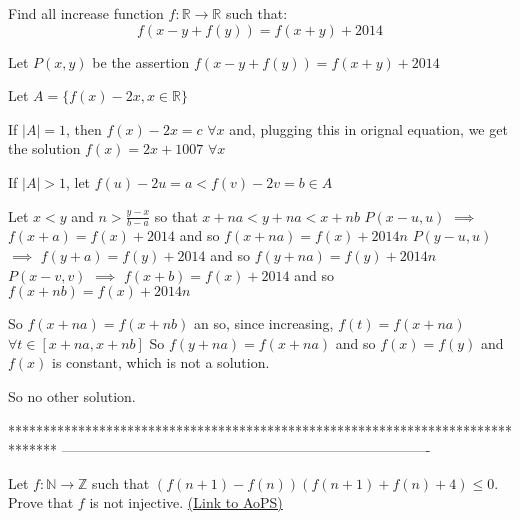 \begin{solution}
	\begin{tcolorbox}Find all increase function $f:\mathbb{R}\rightarrow \mathbb{R}$ such that:
\[f(x-y+f(y))=f(x+y)+2014\]\end{tcolorbox}
Let $P(x,y)$ be the assertion $f(x-y+f(y))=f(x+y)+2014$

Let $A=\{f(x)-2x, x\in\mathbb R\}$

If $|A|=1$, then $f(x)-2x=c$ $\forall x$ and, plugging this in orignal equation, we get the solution $\boxed{f(x)=2x+1007}$ $\forall x$

If $|A|>1$, let $f(u)-2u=a<f(v)-2v=b\in A$

Let $x<y$ and $n>\frac{y-x}{b-a}$ so that $x+na<y+na<x+nb$
$P(x-u,u)$ $\implies$ $f(x+a)=f(x)+2014$ and so $f(x+na)=f(x)+2014n$
$P(y-u,u)$ $\implies$ $f(y+a)=f(y)+2014$ and so $f(y+na)=f(y)+2014n$
$P(x-v,v)$ $\implies$ $f(x+b)=f(x)+2014$ and so $f(x+nb)=f(x)+2014n$

So $f(x+na)=f(x+nb)$ an so, since increasing, $f(t)=f(x+na)$ $\forall t\in[x+na, x+nb]$
So $f(y+na)=f(x+na)$ and so $f(x)=f(y)$ and $f(x)$ is constant, which is not a solution.

So no other solution.
\end{solution}
*******************************************************************************
-------------------------------------------------------------------------------

\begin{problem}
	Let $f: \mathbb{N}\to \mathbb{Z}$ such that $(f(n+1)-f(n))(f(n+1)+f(n)+4) \le 0$. Prove that $f$ is not injective.
	\flushright \href{https://artofproblemsolving.com/community/c6h568869}{(Link to AoPS)}
\end{problem}




